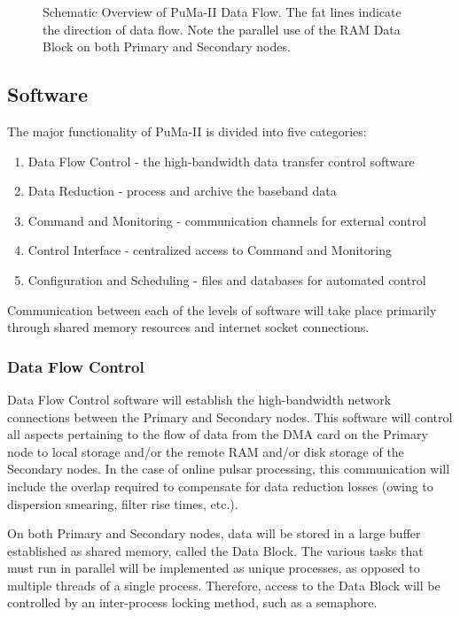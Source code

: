 \begin{figure}
\centerline{}
\caption [\sffamily PuMa-II Data Flow]
{
Schematic Overview of PuMa-II Data Flow.  The fat lines indicate the 
direction of data flow.  Note the parallel use of the RAM Data Block 
on both Primary and Secondary nodes.
}
\label{fig:layout}
\end{figure}

\subsection{Software}

The major functionality of PuMa-II is divided into five categories:

\begin{enumerate}

\item Data Flow Control - the high-bandwidth data transfer control software
\item Data Reduction - process and archive the baseband data
\item Command and Monitoring - communication channels for external control
\item Control Interface - centralized access to Command and Monitoring
\item Configuration and Scheduling - files and databases for automated control

\end{enumerate}

Communication between each of the levels of software will take place
primarily through shared memory resources and internet socket
connections.

\subsubsection{Data Flow Control}

Data Flow Control software will establish the high-bandwidth network
connections between the Primary and Secondary nodes.  This software
will control all aspects pertaining to the flow of data from the DMA
card on the Primary node to local storage and/or the remote RAM and/or
disk storage of the Secondary nodes.  In the case of online pulsar
processing, this communication will include the overlap required to
compensate for data reduction losses (owing to dispersion smearing,
filter rise times, etc.).  

On both Primary and Secondary nodes, data will be stored in a large
buffer established as shared memory, called the Data Block.  The
various tasks that must run in parallel will be implemented as unique
processes, as opposed to multiple threads of a single process.
Therefore, access to the Data Block will be controlled by an
inter-process locking method, such as a semaphore.

